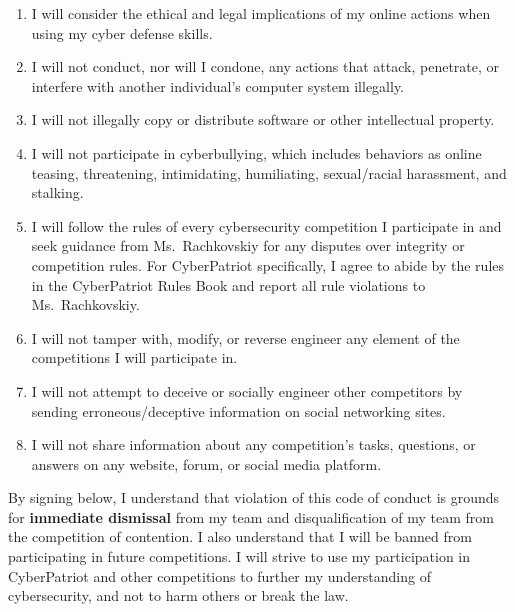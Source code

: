 \documentclass[
  letterpaper,
  DIV=11,
  numbers=noendperiod]{scrartcl}
\providecommand{\tightlist}{%
  \setlength{\itemsep}{0pt}\setlength{\parskip}{0pt}}\usepackage{longtable,booktabs,array}
\begin{document}
\begin{enumerate}
\def\labelenumi{\arabic{enumi})}
\tightlist
\item
  I will consider the ethical and legal implications of my online
  actions when using my cyber defense skills.
\item
  I will not conduct, nor will I condone, any actions that attack,
  penetrate, or interfere with another individual's computer system
  illegally.
\item
  I will not illegally copy or distribute software or other intellectual
  property.
\item
  I will not participate in cyberbullying, which includes behaviors as
  online teasing, threatening, intimidating, humiliating, sexual/racial
  harassment, and stalking.
\item
  I will follow the rules of every cybersecurity competition I
  participate in and seek guidance from Ms.~Rachkovskiy for any disputes
  over integrity or competition rules. For CyberPatriot specifically, I
  agree to abide by the rules in the CyberPatriot Rules Book and report
  all rule violations to Ms.~Rachkovskiy.
\item
  I will not tamper with, modify, or reverse engineer any element of the
  competitions I will participate in.
\item
  I will not attempt to deceive or socially engineer other competitors
  by sending erroneous/deceptive information on social networking sites.
\item
  I will not share information about any competition's tasks, questions,
  or answers on any website, forum, or social media platform.
\end{enumerate}

By signing below, I understand that violation of this code of conduct is
grounds for \textbf{immediate dismissal} from my team and
disqualification of my team from the competition of contention. I also
understand that I will be banned from participating in future
competitions. I will strive to use my participation in CyberPatriot and
other competitions to further my understanding of cybersecurity, and not
to harm others or break the law.
\end{document}
